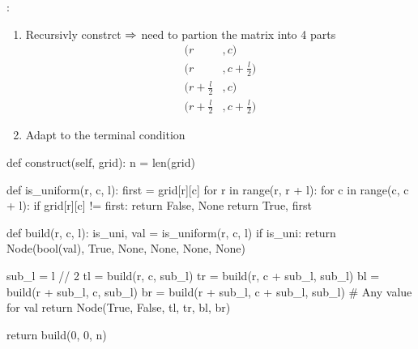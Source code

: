 :
\begin{enumerate}
\item Recursivly constrct $\Rightarrow$ need to partion the matrix into 4 parts
\begin{align*}
(r&, c) \\
(r&, c + \frac{l}{2}) \\
(r+\frac{l}{2}&, c) \\
(r+\frac{l}{2}&, c+\frac{l}{2})
\end{align*}
\item Adapt to the terminal condition
\end{enumerate}
\begin{python}
def construct(self, grid):
  n = len(grid)

  def is_uniform(r, c, l):
    first = grid[r][c]
    for r in range(r, r + l):
      for c in range(c, c + l):
        if grid[r][c] != first:
          return False, None
    return True, first

  def build(r, c, l):
    is_uni, val = is_uniform(r, c, l)
    if is_uni:
      return Node(bool(val), True, None, None, None, None)

    sub_l = l // 2
    tl = build(r, c, sub_l)
    tr = build(r, c + sub_l, sub_l)
    bl = build(r + sub_l, c, sub_l)
    br = build(r + sub_l, c + sub_l, sub_l)
    # Any value for val 
    return Node(True, False, tl, tr, bl, br)

  return build(0, 0, n)
\end{python}

